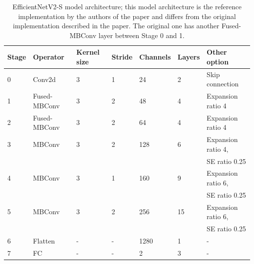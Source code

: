 \newpage
\begin{table}[H]
    \centering
    \caption{EfficientNetV2-S model architecture; this model architecture is the reference implementation by the authors of the paper and differs from the original implementation described in the paper. The original one has another Fused-MBConv layer between Stage 0 and 1.}
    \label{table:EffNetV2-S}
    \begin{tabular}{lllllll}
    Stage & Operator & Kernel size & Stride & Channels & Layers & Other option \\ \hline \hline
    0 & Conv2d & 3 & 1 & 24 & 2 & Skip connection \\ \hline
    1 & Fused-MBConv & 3 & 2 & 48 & 4 & Expansion ratio 4 \\ \hline
    2 & Fused-MBConv & 3 & 2 & 64 & 4 & Expansion ratio 4 \\ \hline
    3 & MBConv & 3 & 2 & 128 & 6 & Expansion ratio 4, \\ &&&&&& SE ratio 0.25  \\ \hline
    4 & MBConv & 3 & 1 & 160 & 9 & Expansion ratio 6, \\ &&&&&& SE ratio 0.25  \\ \hline
    5 & MBConv & 3 & 2 & 256 & 15 & Expansion ratio 6, \\ &&&&&& SE ratio 0.25  \\ \hline
    6 & Flatten & - & - & 1280 & 1 & - \\ \hline
    7 & FC & - & - & 2 & 3 & - \\ \hline
    \end{tabular}
\end{table}

